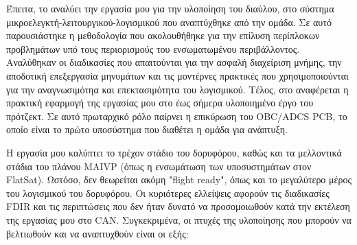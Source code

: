 \documentclass[a4paper,nobib,justified]{tufte-book}
\begin{document}
\par Έπειτα, το  αναλύει την εργασία μου για την υλοποίηση του διαύλου, στο σύστημα μικροελεγκτή-λειτουργικού-λογισμικού που αναπτύχθηκε από την ομάδα. Σε αυτό παρουσιάστηκε η μεθοδολογία που ακολουθήθηκε για την επίλυση περίπλοκων προβλημάτων υπό τους περιορισμούς του ενσωματωμένου περιβάλλοντος. Αναλύθηκαν οι διαδικασίες που απαιτούνται για την ασφαλή διαχείριση μνήμης, την αποδοτική επεξεργασία μηνυμάτων και τις μοντέρνες πρακτικές που χρησιμοποιούνται για την αναγνωσιμότηα και επεκτασιμότητα του λογισμικού. Τέλος, στο  αναφέρεται η πρακτική εφαρμογή της εργασίας μου στο έως σήμερα υλοποιημένο έργο του πρότζεκτ. Σε αυτό πρωταρχικό ρόλο παίρνει η επικύρωση του OBC/ADCS PCB, το οποίο είναι το πρώτο υποσύστημα που διαθέτει η ομάδα για ανάπτυξη.

Η εργασία μου καλύπτει το τρέχον στάδιο του δορυφόρου, καθώς και τα μελλοντικά στάδια του πλάνου MAIVP (όπως η ενσωμάτωση των υποσυστημάτων στον FlatSat). Ωστόσο, δεν θεωρείται ακόμη "flight ready", όπως και το μεγαλύτερο μέρος του λογισμικού του δορυφόρου. Οι κυριότερες ελλείψεις αφορούν τις διαδικασίες FDIR και τις περιπτώσεις που δεν ήταν δυνατό να προσομοιωθούν κατά την εκτέλεση της εργασίας μου στο CAN. Συγκεκριμένα, οι πτυχές της υλοποίησης που μπορούν να βελτιωθούν και να αναπτυχθούν είναι οι εξής:
\end{document}
